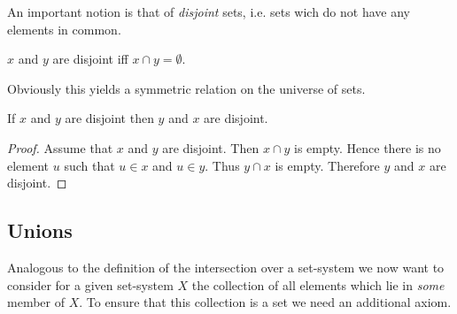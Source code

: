 \documentclass[../../set-theory.ftl.tex]{subfiles}
\begin{document}
  \noindent An important notion is that of \textit{disjoint} sets, i.e. sets
  wich do not have any elements in common.

  \begin{forthel}
    \begin{definition}
      $x$ and $y$ are disjoint iff $x \cap y = \emptyset$.
    \end{definition}
  \end{forthel}

  \noindent Obviously this yields a symmetric relation on the universe of sets.

  \begin{forthel}
    \begin{proposition}\label{SetTheory_01_01_300845}
      If $x$ and $y$ are disjoint then $y$ and $x$ are disjoint.
    \end{proposition}
    \begin{proof}
      Assume that $x$ and $y$ are disjoint.
      Then $x \cap y$ is empty.
      Hence there is no element $u$ such that $u \in x$ and $u \in y$.
      Thus $y \cap x$ is empty.
      Therefore $y$ and $x$ are disjoint.
    \end{proof}
  \end{forthel}


  \subsection{Unions}

  \noindent Analogous to the definition of the intersection over a set-system
  we now want to consider for a given set-system $X$ the collection of all
  elements which lie in \textit{some} member of $X$.
  To ensure that this collection is a set we need an additional axiom.
\end{document}
